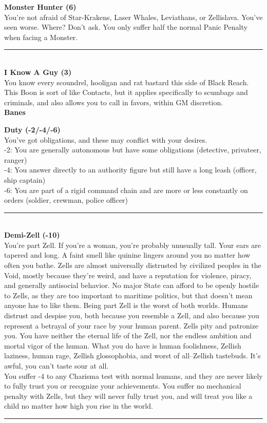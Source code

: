 \documentclass[a4paper, twocolumn, openany]{book}
\begin{document}
{{\bfseries Monster Hunter (6)\\}
You’re not afraid of Star-Krakens, Laser Whales, Leviathans, or Zellislava. You’ve seen worse.
Where? Don’t ask. You only suffer half the normal Panic Penalty when facing a Monster.\\
\hrule\ \\

{\bfseries I Know A Guy (3)\\}
You know every scoundrel, hooligan and rat bastard this side of Black Reach. This Boon is sort
of like Contacts, but it applies specifically to scumbags and criminals, and also allows you to call
in favors, within GM discretion.\\

{\Large\bfseries Banes\\}

{\bfseries Duty (-2/-4/-6)\\}
You’ve got obligations, and these may conflict with your desires.\\
-2: You are generally autonomous but have some obligations (detective, privateer, ranger)\\
-4: You answer directly to an authority figure but still have a long leash (officer, ship captain)\\
-6: You are part of a rigid command chain and are more or less constantly on orders (soldier,
crewman, police officer)\\
\hrule\ \\

{\bfseries Demi-Zell (-10)\\}
You’re part Zell. If you’re a woman, you’re probably unusually tall. Your ears are tapered and
long. A faint smell like quinine lingers around you no matter how often you bathe. Zells are
almost universally distrusted by civilized peoples in the Void, mostly because they’re weird, and
have a reputation for violence, piracy, and generally antisocial behavior. No major State can
afford to be openly hostile to Zells, as they are too important to maritime politics, but that doesn’t
mean anyone has to like them. Being part Zell is the worst of both worlds. Humans distrust and
despise you, both because you resemble a Zell, and also because you represent a betrayal of
your race by your human parent. Zells pity and patronize you. You have neither the eternal life
of the Zell, nor the endless ambition and mortal vigor of the human. What you do have is human
foolishness, Zellish laziness, human rage, Zellish glossophobia, and worst of all--Zellish
tastebuds. It’s awful, you can’t taste sour at all.\\
You suffer -4 to any Charisma test with normal humans, and they are never likely to fully trust
you or recognize your achievements. You suffer no mechanical penalty with Zells, but they will
never fully trust you, and will treat you like a child no matter how high you rise in the world.\\
\hrule\ \\

}
\end{document}

